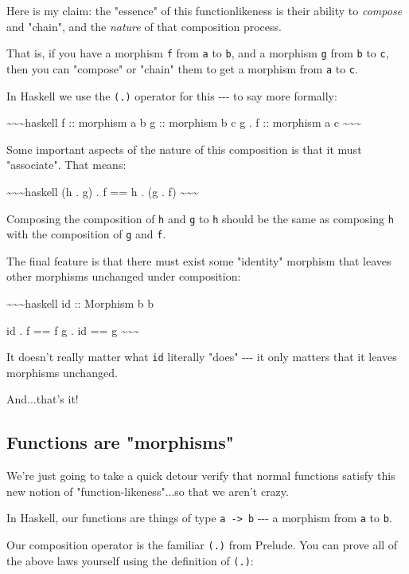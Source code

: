 \documentclass[]{article}
\begin{document}
Here is my claim: the "essence" of this functionlikeness is their ability to
\emph{compose} and "chain", and the \emph{nature} of that composition process.

That is, if you have a morphism \texttt{f} from \texttt{a} to \texttt{b}, and a
morphism \texttt{g} from \texttt{b} to \texttt{c}, then you can "compose" or
"chain" them to get a morphism from \texttt{a} to \texttt{c}.

In Haskell we use the \texttt{(.)} operator for this -\/-\/- to say more
formally:

\textasciitilde{}\textasciitilde{}\textasciitilde{}haskell f :: morphism a b g
:: morphism b c g . f :: morphism a c
\textasciitilde{}\textasciitilde{}\textasciitilde{}

Some important aspects of the nature of this composition is that it must
"associate". That means:

\textasciitilde{}\textasciitilde{}\textasciitilde{}haskell (h . g) . f == h . (g
. f) \textasciitilde{}\textasciitilde{}\textasciitilde{}

Composing the composition of \texttt{h} and \texttt{g} to \texttt{h} should be
the same as composing \texttt{h} with the composition of \texttt{g} and
\texttt{f}.

The final feature is that there must exist some "identity" morphism that leaves
other morphisms unchanged under composition:

\textasciitilde{}\textasciitilde{}\textasciitilde{}haskell id :: Morphism b b

id . f == f g . id == g \textasciitilde{}\textasciitilde{}\textasciitilde{}

It doesn't really matter what \texttt{id} literally "does" -\/-\/- it only
matters that it leaves morphisms unchanged.

And...that's it!

\subsection{Functions are "morphisms"}

We're just going to take a quick detour verify that normal functions satisfy
this new notion of "function-likeness"...so that we aren't crazy.

In Haskell, our functions are things of type \texttt{a\ -\textgreater{}\ b}
-\/-\/- a morphism from \texttt{a} to \texttt{b}.

Our composition operator is the familiar \texttt{(.)} from Prelude. You can
prove all of the above laws yourself using the definition of \texttt{(.)}:
\end{document}

